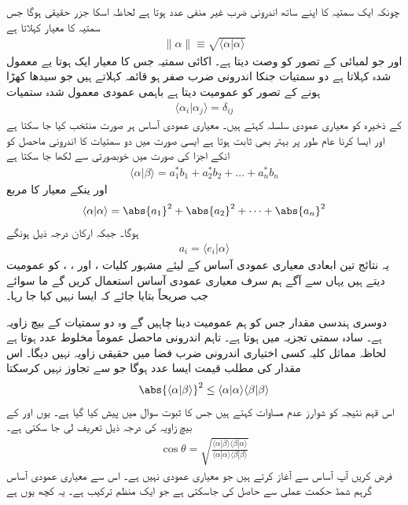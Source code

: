 چونکہ ایک سمتیہ کا اپنے ساتھ اندرونی ضرب غیر منفی عدد ہوتا ہے لحاظہ اسکا جزر حقیقی ہوگا جس سمتیہ کا معیار کہلاتا ہے
\begin{align}
	\|\alpha\|\equiv\sqrt{\langle\alpha|\alpha\rangle}
\end{align}
اور جو لمبائی کے تصور کو وصت دیتا ہے۔ اکائی سمتیہ جس کا معیار ایک ہوتا یے معمول شدہ کہلاتا ہے دو سمتیات جنکا اندرونی ضرب صفر ہو  قائمہ کہلاتے ہیں جو سیدھا کھڑا ہونے کے تصور کو عمومیت دیتا ہے باہمی عمودی معمول شدہ ستمیات
\begin{align}
	\langle\alpha_i|\alpha_j\rangle=\delta_{ij}
\end{align}
کے ذخیرہ کو معیاری عمودی سلسلہ کہتے ہیں۔ معیاری عمودی آساس ہر صورت منتخب کیا جا سکتا ہے اور ایسا کرنا عام طور پر بہتر بھی ثابت ہوتا ہے ایسی صورت میں دو سمتیات کا اندرونی ماحصل کو انکے اجزا کی صورت میں خوبصورتی سے لکھا جا سکتا ہے
\begin{align}
	\langle\alpha|\beta\rangle=a_1^*b_1+a_2^*b_2+\dots+a_n^*b_n
\end{align}
اور ینکے معیار کا مربع
\begin{align}
	\langle\alpha|\alpha\rangle = \abs{a_1}^2+\abs{a_2}^2+\dots+\abs{a_n}^2
\end{align}
ہوگا۔ جبکہ ارکان درجہ ذیل ہونگے
\begin{align}
	a_i=\langle e_i|\alpha\rangle
\end{align}
یہ نتائج تین ابعادی معیاری عمودی آساس  کے لیئے مشہور کلیات ،  اور ، ،  کو عمومیت دیتے ہیں یہاں سے آگے ہم سرف معیاری عمودی آساس استعمال کریں گے ما سوائے جب صریحاً بتایا جائے کہ ایسا نہیں کیا جا رہا۔

دوسری ہندسی مقدار جس کو ہم عمومیت دینا چاہیں گے وہ دو سمتیات کے بیچ زاویہ ہے۔ سادہ سمتی تجزیہ میں  ہوتا ہے۔ تاہم اندرونی ماحصل عموماً مخلوط عدد ہوتا ہے لحاظہ مماثل کلیہ کسی اختیاری اندرونی ضرب فضا میں حقیقی زاویہ  نہیں دیگا۔ اس مقدار کی مطلب قیمت ایسا عدد ہوگا جو  سے تجاوز نہیں کرسکتا
\begin{align}
	\abs{\langle\alpha|\beta\rangle}^2\leq\langle\alpha|\alpha\rangle\langle\beta|\beta\rangle
\end{align}
اس قہم نتیجہ کو شوارز عدم مساوات کہتے ہیں جس کا ثبوت سوال  میں پیش کیا گیا ہے۔ یوں  اور  کے بیچ زاویہ کی درجہ ذیل تعریف لی جا سکتی ہے۔
\begin{align}
	\cos\theta = \sqrt{\frac{\langle\alpha|\beta\rangle\langle\beta|\alpha\rangle}{\langle\alpha|\alpha\rangle\langle\beta|\beta\rangle}}
\end{align}
فرض کریں آپ آساس  سے آغاز کرتے ہیں جو معیاری عمودی نہیں ہے۔ اس سے معیاری عمودی آساس  گرہم شمڈ حکمت عملی سے حاصل کی جاسکتی ہے جو ایک منظم ترکیب ہے۔ یہ کچھ یوں ہے

